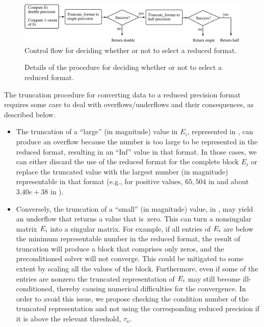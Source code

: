\begin{figure}[t] \begin{center}
		\includegraphics[width=\textwidth]{plots/control-flow}
		\caption{Control flow for deciding whether or not to select a reduced
			format.} \label{2017-adaptive-block-jacobi:fig:control-flow} \end{center} 
		\end{figure}

\begin{figure}[t] \begin{center} \begin{minipage}{\textwidth}
			
		\end{minipage} \caption{Details of the procedure for deciding whether 
		or not to select a
			reduced format.} \label{2017-adaptive-block-jacobi:fig:adaptive} \end{center} 
		\end{figure}

The truncation procedure for converting \fpd data to a reduced precision format 
requires
some care to deal with overflows/underflows and their consequences, as 
described below.
\begin{itemize} 
	\item The truncation of a ``large'' (in magnitude) value in
	$E_i$, represented in \fpd, can produce an overflow because the number
	is too large to be represented in the reduced format, resulting in an 
	``Inf''
	value in that format. In those cases, we can either discard the use of the
	reduced format for the complete block $E_i$ or replace the truncated value 
	with
	the largest number (in magnitude) representable in that format (e.g., for
	positive values, $65,504$ in \fph and about $3.40e+38$ in \fps). 
	\item Conversely, the truncation of a ``small'' (in	magnitude) value, 
	in \fpd, may yield an underflow that returns a value that
	is~zero. This can turn a nonsingular matrix $E_i$ into a singular matrix. 
	For
	example, if all entries of $E_i$ are below the minimum representable 
	number in
	the reduced format, the result of truncation will produce a block that 
	comprises
	only zeros, and the preconditioned solver will not converge. This could be 
	mitigated to some extent by scaling all the values of the block. 
	Furthermore, even
	if some of the entries are nonzero the truncated representation of $E_i$ 
	may
	still become ill-conditioned, thereby causing numerical difficulties for 
	the convergence.
	In order to avoid this issue, we propose checking the condition number of 
	the
	truncated representation and not using the corresponding reduced
	precision if it is above the relevant threshold, $\tau_{\kappa}$. 
\end{itemize} 

